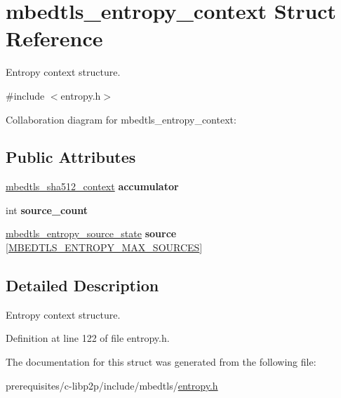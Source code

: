 \hypertarget{structmbedtls__entropy__context}{}\section{mbedtls\+\_\+entropy\+\_\+context Struct Reference}
\label{structmbedtls__entropy__context}


Entropy context structure.  




{\ttfamily \#include $<$entropy.\+h$>$}



Collaboration diagram for mbedtls\+\_\+entropy\+\_\+context\+:
\subsection*{Public Attributes}
\begin{DoxyCompactItemize}
\item 
\mbox{\label{structmbedtls__entropy__context_ae685a3bbe7478a809c511a57e7247422}} 
\mbox{\hyperlink{structmbedtls__sha512__context}{mbedtls\+\_\+sha512\+\_\+context}} {\bfseries accumulator}
\item 
\mbox{\label{structmbedtls__entropy__context_ae21caec42d2e42c87762fcbb4079cb1b}} 
int {\bfseries source\+\_\+count}
\item 
\mbox{\label{structmbedtls__entropy__context_a8a95d0e03ef1bc1f198e23e201c064be}} 
\mbox{\hyperlink{structmbedtls__entropy__source__state}{mbedtls\+\_\+entropy\+\_\+source\+\_\+state}} {\bfseries source} \mbox{[}\mbox{\hyperlink{entropy_8h_a819aa4f3046aa257738f0dafe481ca1f}{M\+B\+E\+D\+T\+L\+S\+\_\+\+E\+N\+T\+R\+O\+P\+Y\+\_\+\+M\+A\+X\+\_\+\+S\+O\+U\+R\+C\+ES}}\mbox{]}
\end{DoxyCompactItemize}


\subsection{Detailed Description}
Entropy context structure. 

Definition at line 122 of file entropy.\+h.



The documentation for this struct was generated from the following file\+:\begin{DoxyCompactItemize}
\item 
prerequisites/c-\/libp2p/include/mbedtls/\mbox{\hyperlink{entropy_8h}{entropy.\+h}}\end{DoxyCompactItemize}
